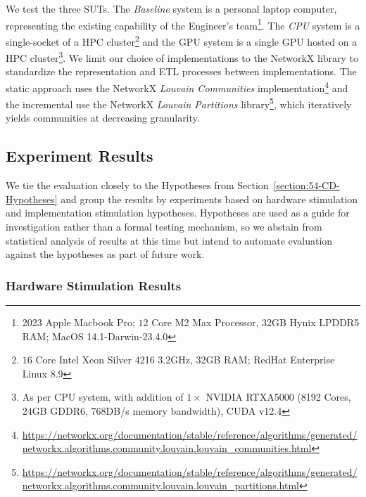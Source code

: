 We test the three \ac{SUT}s.
The \textit{Baseline} system is a personal laptop computer, representing the existing capability of the Engineer's team\footnote{\scriptsize 2023 Apple Macbook Pro; $12$ Core M2 Max Processor, 32GB Hynix LPDDR5 RAM; MacOS 14.1-Darwin-23.4.0}.
The \textit{CPU} system is a single-socket of a \ac{HPC} cluster\footnote{\scriptsize $16$ Core Intel Xeon Silver 4216 3.2GHz, 32GB RAM; RedHat Enterprise Linux 8.9} and the \ac{GPU} system is a single GPU hosted on a \ac{HPC} cluster\footnote{\scriptsize As per \ac{CPU} system, with addition of $1\times$ NVIDIA RTXA5000 (8192 Cores, $24$GB GDDR6, $768$DB/s memory bandwidth), \ac{CUDA} v12.4}.
We limit our choice of implementations to the NetworkX library to standardize the representation and \ac{ETL} processes between implementations. 
The static approach uses the NetworkX \textit{Louvain Communities} implementation\footnote{\scriptsize \url{https://networkx.org/documentation/stable/reference/algorithms/generated/networkx.algorithms.community.louvain.louvain_communities.html}} and the incremental use the NetworkX \textit{Louvain Partitions} library\footnote{\scriptsize \url{https://networkx.org/documentation/stable/reference/algorithms/generated/networkx.algorithms.community.louvain.louvain_partitions.html}}, which iteratively yields communities at decreasing granularity. 



\subsection{Experiment Results}

We tie the evaluation closely to the Hypotheses from Section~\ref{section:54-CD-Hypotheses} and group the results by experiments based on hardware stimulation and implementation stimulation hypotheses.
Hypotheses are used as a guide for investigation rather than a formal testing mechanism, so we abstain from statistical analysis of results at this time but intend to automate evaluation against the hypotheses as part of future work. 

\subsubsection{Hardware Stimulation Results}



